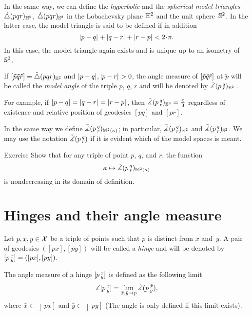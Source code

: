 In the same way, we can define the \emph{hyperbolic} and the \emph{spherical model triangles} $\tilde\triangle(p q r)_{\mathbb{H}^2}$, $\tilde\triangle(p q r)_{\mathbb{S}^2}$
in the Lobachevsky plane $\mathbb{H}^2$ and the unit sphere~$\mathbb{S}^2$.
In the latter case, the model triangle is said to be defined if in addition
\[\dist{p}{q}{}+\dist{q}{r}{}+\dist{r}{p}{}< 2\cdot\pi.\]
In this case, the model triangle again exists and is unique up to an isometry of~$\mathbb{S}^2$.

If 
$[\tilde p\tilde q\tilde r]=\tilde\triangle(p q r)_{\mathbb{E}^2}$ 
and $|{p}-{q}|_{}^{{}},|{p}-{r}|_{}^{{}}>0$, 
the angle measure of 
$[\tilde p\tilde q\tilde r]$ at $\tilde p$ 
will be called the \emph{model angle} of the triple $p$, $q$, $r$ and will be denoted by
$\tilde\measuredangle(p\,{}^{q}_{r})_{\mathbb{E}^2}$%
.\label{page:model-angle}

For example, if $|{p}-{q}|_{}^{{}}=|{q}-{r}|_{}^{{}}=|{r}-{p}|_{}^{{}}$, then $\tilde\measuredangle(p\,{}^{q}_{r})_{\mathbb{E}^2}=\tfrac\pi3$ regardless of existence and relative position of geodesics $[pq]$ and $[pr]$.

In the same way we define $\tilde\measuredangle(p\,{}^{q}_{r})_{\mathbb{M}^2(\kappa)}$;
in particular, $\tilde\measuredangle(p\,{}^{q}_{r})_{\mathbb{H}^2}$ and $\tilde\measuredangle(p\,{}^{q}_{r})_{\mathbb{S}^2}$.
We may use the notation $\tilde\measuredangle(p\,{}^{q}_{r})$ if it is evident which of the model spaces is meant.

\begin{thm}{Exercise}\label{ex:k-><mono}
Show that for any triple of point $p$, $q$, and $r$,
the function
\[\kappa\mapsto \tilde\measuredangle(p\,{}^{q}_{r})_{\mathbb{M}^2(\kappa)}\]
is nondecreasing in its domain of definition.
\end{thm}


\section{Hinges and their angle measure}\label{sec:angles}

 Let $p,x,y\in \mathcal{X}$ be a triple of points such that $p$ is distinct from $x$ and~$y$.
A pair of geodesics $([p x],[p y])$ will be called  a \emph{hinge} and will be denoted by 
$[p\,{}^{x}_{y}]=([p x],[p y])$.

The angle measure of a hinge $[p\,{}^{x}_{y}]$ is defined as the following limit
\[\measuredangle[p\,{}^{x}_{y}]=\lim_{\bar x,\bar y\to p} \tilde\measuredangle(p\,{}^{\bar x}_{\bar y}),\]
where $\bar x\in\left]p x\right]$ and $\bar y\in\left]p y\right]$ (The angle is only defined if this limit exists).

